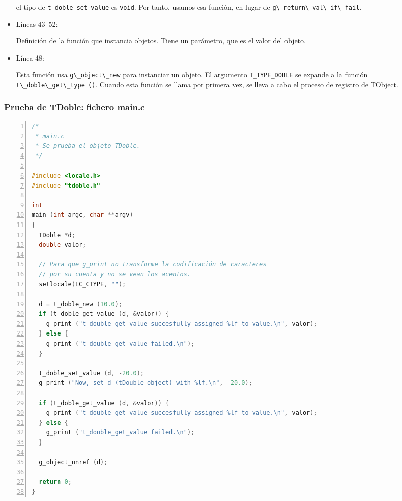 \begin{itemize}
  el tipo de \texttt{t\_doble\_set\_value} es \texttt{void}. Por tanto, usamos esa función, en lugar de
  \passthrough{\lstinline!g\_return\_val\_if\_fail!}.
\item Líneas 43--52:\par
  Definición de la función que instancia objetos. Tiene un parámetro, que es el valor del objeto.
\item Línea 48:\par
  Esta función usa \passthrough{\lstinline!g\_object\_new!} para instanciar un objeto. El argumento
  \texttt{T\_TYPE\_DOBLE} se expande a la función \passthrough{\lstinline!t\_doble\_get\_type ()!}.
  Cuando esta función se llama por primera vez, se lleva a cabo el proceso de registro de \textsf{TObject}.
\end{itemize}

\subsubsection{Prueba de \textsf{TDoble}: fichero \textsf{main.c}}

\begin{lstlisting}[language=C, numbers=left]
/*
 * main.c
 * Se prueba el objeto TDoble.
 */

#include <locale.h>
#include "tdoble.h"

int
main (int argc, char **argv)
{
  TDoble *d;
  double valor;

  // Para que g_print no transforme la codificación de caracteres
  // por su cuenta y no se vean los acentos.
  setlocale(LC_CTYPE, "");

  d = t_doble_new (10.0);
  if (t_doble_get_value (d, &valor)) {
    g_print ("t_double_get_value succesfully assigned %lf to value.\n", valor);
  } else {
    g_print ("t_double_get_value failed.\n");
  }

  t_doble_set_value (d, -20.0);
  g_print ("Now, set d (tDouble object) with %lf.\n", -20.0);
  
  if (t_doble_get_value (d, &valor)) {
    g_print ("t_double_get_value succesfully assigned %lf to value.\n", valor);
  } else {
    g_print ("t_double_get_value failed.\n");
  }
  
  g_object_unref (d);

  return 0;
}
\end{lstlisting}

